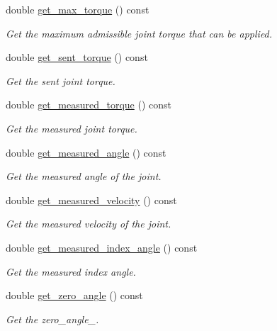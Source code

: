 \begin{DoxyCompactItemize}
double \hyperlink{classblmc__robots_1_1BlmcJointModule_a2adf96563484a68b429185e7a2e98bb3}{get\+\_\+max\+\_\+torque} () const 
\begin{DoxyCompactList}\small\item\em Get the maximum admissible joint torque that can be applied. \end{DoxyCompactList}\item 
double \hyperlink{classblmc__robots_1_1BlmcJointModule_ac3445fef0daa4abb432a025eb161a65b}{get\+\_\+sent\+\_\+torque} () const 
\begin{DoxyCompactList}\small\item\em Get the sent joint torque. \end{DoxyCompactList}\item 
double \hyperlink{classblmc__robots_1_1BlmcJointModule_ac18206a4ba25a37368f05bc6de0a655d}{get\+\_\+measured\+\_\+torque} () const 
\begin{DoxyCompactList}\small\item\em Get the measured joint torque. \end{DoxyCompactList}\item 
double \hyperlink{classblmc__robots_1_1BlmcJointModule_a6543f8befbc9911b67e1f40cf5fa9df1}{get\+\_\+measured\+\_\+angle} () const 
\begin{DoxyCompactList}\small\item\em Get the measured angle of the joint. \end{DoxyCompactList}\item 
double \hyperlink{classblmc__robots_1_1BlmcJointModule_aaa857a81f3600c6a7d5da8c8480d460d}{get\+\_\+measured\+\_\+velocity} () const 
\begin{DoxyCompactList}\small\item\em Get the measured velocity of the joint. \end{DoxyCompactList}\item 
double \hyperlink{classblmc__robots_1_1BlmcJointModule_a48e936ec25f199c7cb41d2490a4891e0}{get\+\_\+measured\+\_\+index\+\_\+angle} () const 
\begin{DoxyCompactList}\small\item\em Get the measured index angle. \end{DoxyCompactList}\item 
double \hyperlink{classblmc__robots_1_1BlmcJointModule_a50dc60d14f6ef65f04e2eb09231325a4}{get\+\_\+zero\+\_\+angle} () const 
\begin{DoxyCompactList}\small\item\em Get the zero\+\_\+angle\+\_\+. \end{DoxyCompactList}\item 

\end{DoxyCompactItemize}
